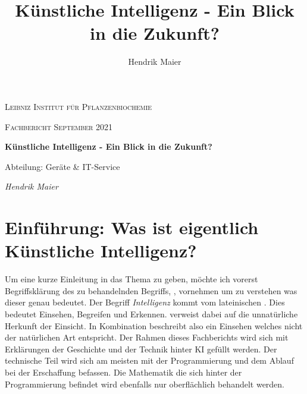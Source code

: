 \documentclass[12pt]{report}
\title{Künstliche Intelligenz - Ein Blick in die Zukunft?}
\author{Hendrik Maier}
\date{}
\begin{document}
    \begin{titlepage}
        \centering
        {\scshape\LARGE Leibniz Institut für Pflanzenbiochemie\par}
        \vspace{1cm}
        {\scshape\Large Fachbericht September 2021\par}
        \vspace{1.5cm}
        {\huge\bfseries Künstliche Intelligenz - Ein Blick in die Zukunft?\par}
        \vspace{2cm}
        {\Large Abteilung: Geräte \& IT-Service\par}
        \vspace{1.5cm}
        {\Large\itshape Hendrik Maier\par}
        \vfill

    \end{titlepage}

    \tableofcontents
    \newpage

    \chapter{Einführung: Was ist eigentlich Künstliche Intelligenz?}
    Um eine kurze Einleitung in das Thema zu geben, möchte ich vorerst Begriffsklärung des zu behandelnden Begriffs,
    , vornehmen um zu verstehen was dieser genau bedeutet.
    Der Begriff \emph{Intelligenz} kommt vom lateinischen . Dies bedeutet Einsehen, Begreifen und Erkennen.\cite{piaget2000psychologie}
     verweist dabei auf die unnatürliche Herkunft der Einsicht. In Kombination beschreibt 
    also ein Einsehen welches nicht der natürlichen Art entspricht. Der Rahmen dieses Fachberichts wird sich mit Erklärungen
    der Geschichte und der Technik hinter KI gefüllt werden. Der technische Teil wird sich am meisten
    mit der Programmierung und dem Ablauf bei der Erschaffung befassen. Die Mathematik die sich hinter
    der Programmierung befindet wird ebenfalls nur oberflächlich behandelt werden.
    
\end{document}
